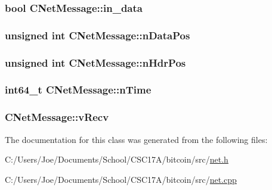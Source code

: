 \subsubsection[{in\+\_\+data}]{\setlength{\rightskip}{0pt plus 5cm}bool C\+Net\+Message\+::in\+\_\+data}\label{class_c_net_message_a8f399ad7225f980bdab3ede17b1b23af}
\hypertarget{class_c_net_message_a418f59287d1805dda6959f27a170c855}{}
\subsubsection[{n\+Data\+Pos}]{\setlength{\rightskip}{0pt plus 5cm}unsigned int C\+Net\+Message\+::n\+Data\+Pos}\label{class_c_net_message_a418f59287d1805dda6959f27a170c855}
\hypertarget{class_c_net_message_a1a500121037490eec4b238906f3a23ad}{}
\subsubsection[{n\+Hdr\+Pos}]{\setlength{\rightskip}{0pt plus 5cm}unsigned int C\+Net\+Message\+::n\+Hdr\+Pos}\label{class_c_net_message_a1a500121037490eec4b238906f3a23ad}
\hypertarget{class_c_net_message_a99d5bbca862ac4b7a88b71a7b679decc}{}
\subsubsection[{n\+Time}]{\setlength{\rightskip}{0pt plus 5cm}int64\+\_\+t C\+Net\+Message\+::n\+Time}\label{class_c_net_message_a99d5bbca862ac4b7a88b71a7b679decc}
\hypertarget{class_c_net_message_a1a25c16099d01362e1663390a2e06d1a}{}
\subsubsection[{v\+Recv}]{ C\+Net\+Message\+::v\+Recv}\label{class_c_net_message_a1a25c16099d01362e1663390a2e06d1a}


The documentation for this class was generated from the following files\+:\begin{DoxyCompactItemize}
\item 
C\+:/\+Users/\+Joe/\+Documents/\+School/\+C\+S\+C17\+A/bitcoin/src/\hyperlink{net_8h}{net.\+h}\item 
C\+:/\+Users/\+Joe/\+Documents/\+School/\+C\+S\+C17\+A/bitcoin/src/\hyperlink{net_8cpp}{net.\+cpp}\end{DoxyCompactItemize}

